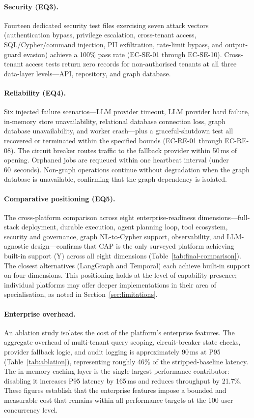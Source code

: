 \documentclass[a4paper]{sapthesis}
\begin{document}
\paragraph{Security (EQ3).}
Fourteen dedicated security test files exercising seven attack vectors
(authentication bypass, privilege escalation, cross-tenant access,
SQL/Cypher/command injection, PII exfiltration, rate-limit bypass, and
output-guard evasion) achieve a 100\% pass rate (EC-SE-01 through
EC-SE-10).  Cross-tenant access tests return zero records for non-authorised
tenants at all three data-layer levels---API, repository, and graph
database.

\paragraph{Reliability (EQ4).}
Six injected failure scenarios---LLM provider timeout, LLM provider hard
failure, in-memory store unavailability, relational database connection
loss, graph database unavailability, and worker crash---plus a
graceful-shutdown test all recovered or terminated within the specified
bounds (EC-RE-01 through EC-RE-08).  The circuit breaker routes
traffic to the fallback provider within 50\,ms of opening.  Orphaned jobs
are requeued within one heartbeat interval (under 60~seconds).  Non-graph
operations continue without degradation when the graph database is
unavailable, confirming that the graph dependency is isolated.

\paragraph{Comparative positioning (EQ5).}
The cross-platform comparison across eight enterprise-readiness
dimensions---full-stack deployment, durable execution, agent planning loop,
tool ecosystem, security and governance, graph NL-to-Cypher support,
observability, and LLM-agnostic design---confirms that CAP is the only
surveyed platform achieving built-in support (Y) across all eight
dimensions (Table~\ref{tab:final-comparison}).  The closest alternatives
(LangGraph and Temporal) each achieve built-in support on four dimensions.
This positioning holds at the level of capability presence; individual
platforms may offer deeper implementations in their area of specialisation,
as noted in Section~\ref{sec:limitations}.

\paragraph{Enterprise overhead.}
An ablation study isolates the cost of the platform's enterprise features.
The aggregate overhead of multi-tenant query scoping, circuit-breaker state
checks, provider fallback logic, and audit logging is approximately 90\,ms
at P95 (Table~\ref{tab:ablation}), representing roughly 46\% of the
stripped-baseline latency.  The in-memory caching layer is the single
largest performance contributor: disabling it increases P95 latency by
165\,ms and reduces throughput by 21.7\%.  These figures establish that the
enterprise features impose a bounded and measurable cost that remains
within all performance targets at the 100-user concurrency level.
\end{document}
